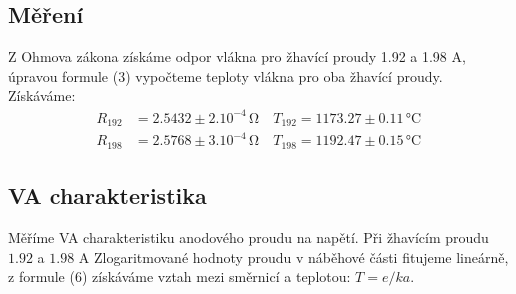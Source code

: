 \documentclass[czech,11pt,a4paper]{article}
\begin{document}
\begin{multicols}{2}
		\section{Měření}
		Z Ohmova zákona získáme odpor vlákna pro žhavící proudy 1.92 a 1.98 A, úpravou formule (3) vypočteme teploty vlákna pro oba žhavící proudy. Získáváme:
		{\small \begin{align*}
			R_{192} & = 2.5432\pm2.10^{-4}\,\mathrm{\Omega} \quad T_{192}= 1173.27 \pm 0.11 \,\text{°C}\,\\
			R_{198} & = 2.5768\pm3.10^{-4 }\,\mathrm{\Omega} \quad T_{198}= 1192.47 \pm 0.15 \,\text{°C}
		\end{align*}}
		\subsection{VA charakteristika}
		Měříme VA charakteristiku anodového proudu na napětí. Při žhavícím proudu $1.92$ a $1.98$ A Zlogaritmované hodnoty proudu v náběhové části fitujeme lineárně, z formule (6) získáváme vztah mezi směrnicí a teplotou: $T = e/ka$.
		

\end{multicols}
\end{document}
